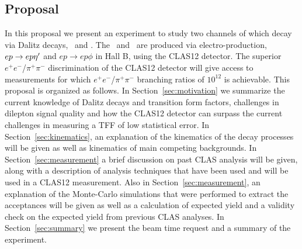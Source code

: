 \subsection{Proposal}
\indent In this proposal we present an experiment to study two channels of which decay via Dalitz decays, \etaDal \ and \phiDal. The \etaT \ and \phiT \ are produced via electro-production, $ep \rightarrow ep\eta^{\prime}$ and $ep \rightarrow ep\phi$ in Hall B, using the CLAS12 detector. The superior $e^+e^-$/$\pi^+\pi^-$ discrimination of the CLAS12 detector will give access to measurements for which  $e^+e^-$/$\pi^+\pi^-$ branching ratios of $10^{12}$ is achievable.
This proposal is organized as follows. In Section~\ref{sec:motivation} we summarize the current knowledge of Dalitz decays and transition form factors, challenges in dilepton signal quality and how the CLAS12 detector can surpass the current challenges in measuring a TFF of low statistical error. In Section~\ref{sec:kinematics}, an explanation of the kinematics of the decay processes will be given as well as kinematics of main competing backgrounds. In Section~\ref{sec:measurement} a brief discussion on past CLAS analysis will be given, along with a description of analysis techniques that have been used and will be used in a CLAS12 measurement. Also in Section~\ref{sec:measurement}, an explanation of the Monte-Carlo simulations that were performed to extract the acceptances will be given as well as a calculation of expected yield and a validity check on the expected yield from previous CLAS analyses. In Section~\ref{sec:summary} we present the beam time request and a summary of the experiment.



